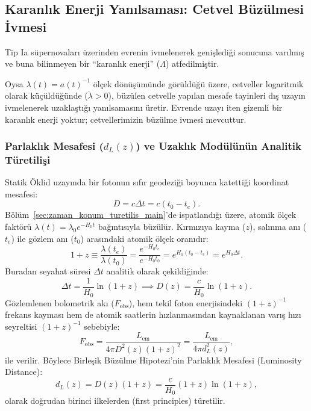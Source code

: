 \subsection{Karanlık Enerji Yanılsaması: Cetvel Büzülmesi İvmesi}
Tip Ia süpernovaları üzerinden evrenin ivmelenerek genişlediği sonucuna varılmış ve buna bilinmeyen bir ``karanlık enerji'' ($\Lambda$) atfedilmiştir.

Oysa $\lambda(t) = a(t)^{-1}$ ölçek dönüşümünde görüldüğü üzere, cetveller logaritmik olarak küçüldüğünde ($\ddot{\lambda} > 0$), büzülen cetvelle yapılan mesafe tayinleri dış uzayın ivmelenerek uzaklaştığı yanılsamasını üretir. Evrende uzayı iten gizemli bir karanlık enerji yoktur; cetvellerimizin büzülme ivmesi mevcuttur.

\subsubsection{Parlaklık Mesafesi (\texorpdfstring{$d_L(z)$}{dL(z)}) ve Uzaklık Modülünün Analitik Türetilişi}
\label{sec:dl_analitik_turetilis}
Statik Öklid uzayında bir fotonun sıfır geodeziği boyunca katettiği koordinat mesafesi:
\begin{equation}
    D = c \Delta t = c (t_0 - t_e).
\end{equation}
Bölüm~\ref{sec:zaman_konum_turetilis_main}'de ispatlandığı üzere, atomik ölçek faktörü $\lambda(t) = \lambda_0 e^{-H_0 t}$ bağıntısıyla büzülür. Kırmızıya kayma ($z$), salınma anı ($t_e$) ile gözlem anı ($t_0$) arasındaki atomik ölçek oranıdır:
\begin{equation}
    1 + z \equiv \frac{\lambda(t_e)}{\lambda(t_0)} = \frac{e^{-H_0 t_e}}{e^{-H_0 t_0}} = e^{H_0 (t_0 - t_e)} = e^{H_0 \Delta t}.
\end{equation}
Buradan seyahat süresi $\Delta t$ analitik olarak çekildiğinde:
\begin{equation}
    \Delta t = \frac{1}{H_0} \ln(1 + z) \implies D(z) = \frac{c}{H_0} \ln(1 + z).
    \label{eq:koordinat_mesafe_ispat}
\end{equation}
Gözlemlenen bolometrik akı ($F_{\mathrm{obs}}$), hem tekil foton enerjisindeki $(1+z)^{-1}$ frekans kayması hem de atomik saatlerin hızlanmasından kaynaklanan varış hızı seyreltisi $(1+z)^{-1}$ sebebiyle:
\begin{equation}
    F_{\mathrm{obs}} = \frac{L_{\mathrm{em}}}{4\pi D^2(z) (1+z)^2} = \frac{L_{\mathrm{em}}}{4\pi d_L^2(z)},
\end{equation}
ile verilir. Böylece Birleşik Büzülme Hipotezi'nin Parlaklık Mesafesi (Luminosity Distance):
\begin{equation}
    \boxed{ d_L(z) = D(z) (1 + z) = \frac{c}{H_0} (1 + z) \ln(1 + z), }
    \label{eq:dl_buzulme_tam_ispat}
\end{equation}
olarak doğrudan birinci ilkelerden (first principles) türetilir.

